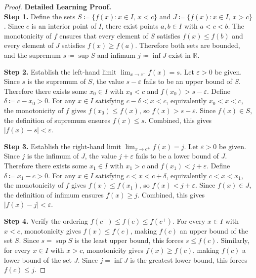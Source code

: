 \begin{proof}
\textbf{Detailed Learning Proof.}~\\

\textbf{Step 1.} Define the sets $S \coloneqq \{f(x) : x \in I,\, x < c\}$ and $J \coloneqq \{f(x) : x \in I,\, x > c\}$. Since $c$ is an interior point of $I$, there exist points $a, b \in I$ with $a < c < b$. The monotonicity of $f$ ensures that every element of $S$ satisfies $f(x) \leq f(b)$ and every element of $J$ satisfies $f(x) \geq f(a)$. Therefore both sets are bounded, and the supremum $s \coloneqq \sup S$ and infimum $j \coloneqq \inf J$ exist in $\mathbb{R}$.

\textbf{Step 2.} Establish the left-hand limit $\lim_{x \to c^{-}} f(x) = s$. Let $\varepsilon > 0$ be given. Since $s$ is the supremum of $S$, the value $s - \varepsilon$ fails to be an upper bound of $S$. Therefore there exists some $x_0 \in I$ with $x_0 < c$ and $f(x_0) > s - \varepsilon$. Define $\delta \coloneqq c - x_0 > 0$. For any $x \in I$ satisfying $c - \delta < x < c$, equivalently $x_0 < x < c$, the monotonicity of $f$ gives $f(x_0) \leq f(x)$, so $f(x) > s - \varepsilon$. Since $f(x) \in S$, the definition of supremum ensures $f(x) \leq s$. Combined, this gives $|f(x) - s| < \varepsilon$.

\textbf{Step 3.} Establish the right-hand limit $\lim_{x \to c^{+}} f(x) = j$. Let $\varepsilon > 0$ be given. Since $j$ is the infimum of $J$, the value $j + \varepsilon$ fails to be a lower bound of $J$. Therefore there exists some $x_1 \in I$ with $x_1 > c$ and $f(x_1) < j + \varepsilon$. Define $\delta \coloneqq x_1 - c > 0$. For any $x \in I$ satisfying $c < x < c + \delta$, equivalently $c < x < x_1$, the monotonicity of $f$ gives $f(x) \leq f(x_1)$, so $f(x) < j + \varepsilon$. Since $f(x) \in J$, the definition of infimum ensures $f(x) \geq j$. Combined, this gives $|f(x) - j| < \varepsilon$.

\textbf{Step 4.} Verify the ordering $f(c^{-}) \leq f(c) \leq f(c^{+})$. For every $x \in I$ with $x < c$, monotonicity gives $f(x) \leq f(c)$, making $f(c)$ an upper bound of the set $S$. Since $s = \sup S$ is the least upper bound, this forces $s \leq f(c)$. Similarly, for every $x \in I$ with $x > c$, monotonicity gives $f(x) \geq f(c)$, making $f(c)$ a lower bound of the set $J$. Since $j = \inf J$ is the greatest lower bound, this forces $f(c) \leq j$.
\end{proof}

